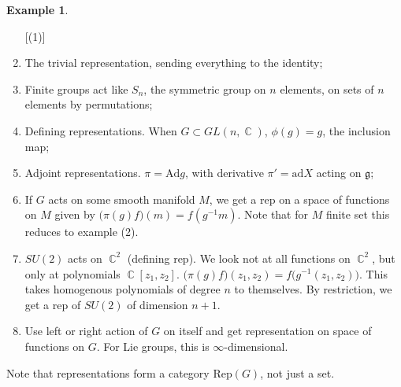 \documentclass[12 pt]{article}
\DeclareMathOperator {\C} {\mathbb{C}}
\theoremstyle{plain}
\theoremstyle{definition}
\newtheorem{exmp}{Example}
\theoremstyle{remark}
\begin{document}
\begin{exmp}
\begin{enumerate} [(1)]
\item The trivial representation, sending everything to the identity;
\item Finite groups act like $S_n$, the symmetric group on $n$ elements, on sets of $n$ elements by permutations;
\item Defining representations. When $G\subset GL(n,\C)$, $\phi(g) = g$, the inclusion map;
\item Adjoint representations. $\pi = \text{Ad} g$, with derivative $\pi' = \text{ad} X$ acting on $\mathfrak g$;
\item If $G$ acts on some smooth manifold $M$, we get a rep on a space of functions on $M$ given by $\big(\pi(g) f\big) (m) = f(g^{-1} m)$. Note that for $M$ finite set this reduces to example (2).
\item $SU(2)$ acts on $\C^2$ (defining rep). We look not at all functions on $\C^2$, but only at polynomials $\C[z_1, z_2]$. $\big(\pi(g) f\big) (z_1, z_2) = f\big(g^{-1} (z_1, z_2)\big)$. This takes homogenous polynomials of degree $n$ to themselves. By restriction, we get a rep of $SU(2)$ of dimension $n+1$.
\item Use left or right action of $G$ on itself and get representation on space of functions on $G$. For Lie groups, this is $\infty$-dimensional.
\end{enumerate}
\end{exmp}
Note that representations form a category Rep$(G)$, not just a set.
\end{document}
